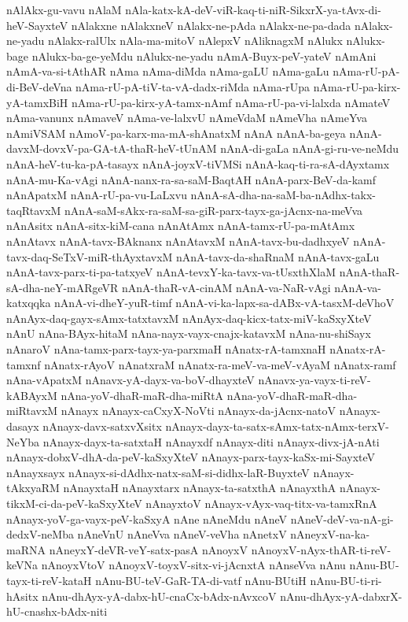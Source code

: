 {nAlAkx-gu-vavu
nAlaM
nAla-katx-kA-deV-viR-kaq-ti-niR-SikxrX-ya-tAvx-di-heV-SayxteV
nAlakxne
nAlakxneV
nAlakx-ne-pAda
nAlakx-ne-pa-dada
nAlakx-ne-yadu
nAlakx-ralUlx
nAla-ma-mitoV
nAlepxV
nAliknagxM
nAlukx
nAlukx-bage
nAlukx-ba-ge-yeMdu
nAlukx-ne-yadu
nAmA-Buyx-peV-yateV
nAmAni
nAmA-va-si-tAthAR
nAma
nAma-diMda
nAma-gaLU
nAma-gaLu
nAma-rU-pA-di-BeV-deVna
nAma-rU-pA-tiV-ta-vA-dadx-riMda
nAma-rUpa
nAma-rU-pa-kirx-yA-tamxBiH
nAma-rU-pa-kirx-yA-tamx-nAmf
nAma-rU-pa-vi-lalxda
nAmateV
nAma-vanunx
nAmaveV
nAma-ve-lalxvU
nAmeVdaM
nAmeVha
nAmeYva
nAmiVSAM
nAmoV-pa-karx-ma-mA-shAnatxM
nAnA
nAnA-ba-geya
nAnA-davxM-dovxV-pa-GA-tA-thaR-heV-tUnAM
nAnA-di-gaLa
nAnA-gi-ru-ve-neMdu
nAnA-heV-tu-ka-pA-tasayx
nAnA-joyxV-tiVMSi
nAnA-kaq-ti-ra-sA-dAyxtamx
nAnA-mu-Ka-vAgi
nAnA-nanx-ra-sa-saM-BaqtAH
nAnA-parx-BeV-da-kamf
nAnApatxM
nAnA-rU-pa-vu-LaLxvu
nAnA-sA-dha-na-saM-ba-nAdhx-takx-taqRtavxM
nAnA-saM-sAkx-ra-saM-sa-giR-parx-tayx-ga-jAcnx-na-meVva
nAnAsitx
nAnA-sitx-kiM-cana
nAnAtAmx
nAnA-tamx-rU-pa-mAtAmx
nAnAtavx
nAnA-tavx-BAknanx
nAnAtavxM
nAnA-tavx-bu-dadhxyeV
nAnA-tavx-daq-SeTxV-miR-thAyxtavxM
nAnA-tavx-da-shaRnaM
nAnA-tavx-gaLu
nAnA-tavx-parx-ti-pa-tatxyeV
nAnA-tevxY-ka-tavx-va-tUsxthXlaM
nAnA-thaR-sA-dha-neY-mARgeVR
nAnA-thaR-vA-cinAM
nAnA-va-NaR-vAgi
nAnA-va-katxqqka
nAnA-vi-dheY-yuR-timf
nAnA-vi-ka-lapx-sa-dABx-vA-tasxM-deVhoV
nAnAyx-daq-gayx-sAmx-tatxtavxM
nAnAyx-daq-kicx-tatx-miV-kaSxyXteV
nAnU
nAna-BAyx-hitaM
nAna-nayx-vayx-cnajx-katavxM
nAna-nu-shiSayx
nAnaroV
nAna-tamx-parx-tayx-ya-parxmaH
nAnatx-rA-tamxnaH
nAnatx-rA-tamxnf
nAnatx-rAyoV
nAnatxraM
nAnatx-ra-meV-va-meV-vAyaM
nAnatx-ramf
nAna-vApatxM
nAnavx-yA-dayx-va-boV-dhayxteV
nAnavx-ya-vayx-ti-reV-kABAyxM
nAna-yoV-dhaR-maR-dha-miRtA
nAna-yoV-dhaR-maR-dha-miRtavxM
nAnayx
nAnayx-caCxyX-NoVti
nAnayx-da-jAcnx-natoV
nAnayx-dasayx
nAnayx-davx-satxvXsitx
nAnayx-dayx-ta-satx-sAmx-tatx-nAmx-terxV-NeYba
nAnayx-dayx-ta-satxtaH
nAnayxdf
nAnayx-diti
nAnayx-divx-jA-nAti
nAnayx-dobxV-dhA-da-peV-kaSxyXteV
nAnayx-parx-tayx-kaSx-mi-SayxteV
nAnayxsayx
nAnayx-si-dAdhx-natx-saM-si-didhx-laR-BuyxteV
nAnayx-tAkxyaRM
nAnayxtaH
nAnayxtarx
nAnayx-ta-satxthA
nAnayxthA
nAnayx-tikxM-ci-da-peV-kaSxyXteV
nAnayxtoV
nAnayx-vAyx-vaq-titx-va-tamxRnA
nAnayx-yoV-ga-vayx-peV-kaSxyA
nAne
nAneMdu
nAneV
nAneV-deV-va-nA-gi-dedxV-neMba
nAneVnU
nAneVva
nAneV-veVha
nAnetxV
nAneyxV-na-ka-maRNA
nAneyxY-deVR-veY-satx-pasA
nAnoyxV
nAnoyxV-nAyx-thAR-ti-reV-keVNa
nAnoyxVtoV
nAnoyxV-toyxV-sitx-vi-jAcnxtA
nAnseVva
nAnu
nAnu-BU-tayx-ti-reV-kataH
nAnu-BU-teV-GaR-TA-di-vatf
nAnu-BUtiH
nAnu-BU-ti-ri-hAsitx
nAnu-dhAyx-yA-dabx-hU-cnaCx-bAdx-nAvxcoV
nAnu-dhAyx-yA-dabxrX-hU-cnashx-bAdx-niti
}
